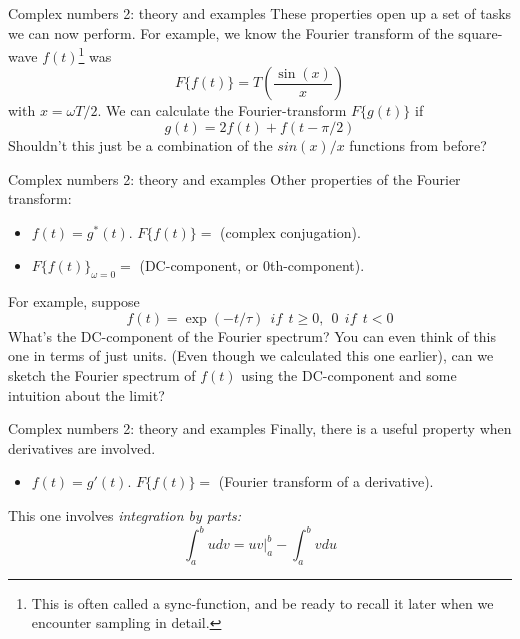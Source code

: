 \documentclass{beamer}
\begin{document}
\begin{frame}[fragile]{Complex numbers 2: theory and examples}
\small
These properties open up a set of tasks we can now perform.  For example, we know the Fourier transform of the square-wave $f(t)$\footnote{This is often called a sync-function, and be ready to recall it later when we encounter sampling in detail.} was
\begin{equation}
F \lbrace f(t) \rbrace = T \left(\frac{\sin(x)}{x}\right)
\end{equation}
with $x = \omega T/2$.  We can calculate the Fourier-transform $F \lbrace g(t) \rbrace$ if 
\begin{equation}
g(t) = 2 f(t) + f(t-\pi/2)
\end{equation}
Shouldn't this just be a combination of the $sin(x)/x$ functions from before?
\end{frame}

\begin{frame}[fragile]{Complex numbers 2: theory and examples}
\small
Other properties of the Fourier transform:
\begin{itemize}
\item $f(t) = g^*(t)$.  $F\lbrace f(t) \rbrace = $ (complex conjugation).
\item $F\lbrace f(t) \rbrace_{\omega=0} = $ (DC-component, or 0th-component).
\end{itemize}
For example, suppose
\begin{equation}
f(t) = \exp(-t/\tau)~~if~~t\geq 0,~~0~~if~~t<0
\end{equation}
What's the DC-component of the Fourier spectrum?  You can even think of this one in terms of just units.  (Even though we calculated this one earlier), can we sketch the Fourier spectrum of $f(t)$ using the DC-component and some intuition about the limit?
\end{frame}

\begin{frame}[fragile]{Complex numbers 2: theory and examples}
Finally, there is a useful property when derivatives are involved.
\begin{itemize}
\item $f(t) = g'(t)$.  $F\lbrace f(t) \rbrace = $ (Fourier transform of a derivative).
\end{itemize}
This one involves \textit{integration by parts:}
\begin{equation}
\int_a^{b} u dv = uv|_a^{b} - \int_a^{b} v du
\end{equation}
\end{frame}
\end{document}
